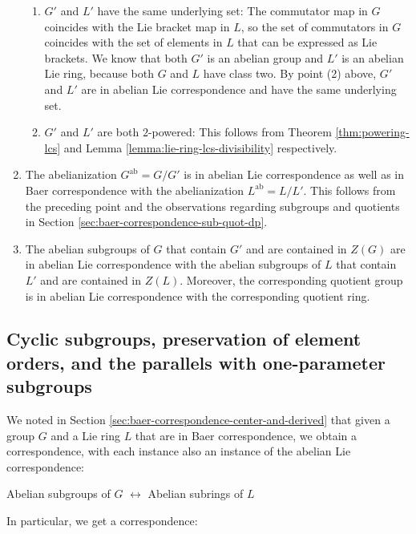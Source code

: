 \begin{enumerate}
  \begin{enumerate}
  \item $G'$ and $L'$ have the same underlying set: The commutator map
    in $G$ coincides with the Lie bracket map in $L$, so the set of
    commutators in $G$ coincides with the set of elements in $L$ that
    can be expressed as Lie brackets. We know that both $G'$ is an
    abelian group and $L'$ is an abelian Lie ring, because both $G$
    and $L$ have class two.  By point (2) above, $G'$ and $L'$ are in
    abelian Lie correspondence and have the same underlying set.
  \item $G'$ and $L'$ are both $2$-powered: This follows from Theorem
    \ref{thm:powering-lcs} and Lemma
    \ref{lemma:lie-ring-lcs-divisibility} respectively.
  \end{enumerate}
\item The abelianization $G^{\operatorname{ab}} = G/G'$ is in abelian
  Lie correspondence as well as in Baer correspondence with the
  abelianization $L^{\operatorname{ab}} = L/L'$. This follows from the
  preceding point and the observations regarding subgroups and
  quotients in Section \ref{sec:baer-correspondence-sub-quot-dp}.
\item The abelian subgroups of $G$ that contain $G'$ and are contained
  in $Z(G)$ are in abelian Lie correspondence with the abelian
  subgroups of $L$ that contain $L'$ and are contained in
  $Z(L)$. Moreover, the corresponding quotient group is in abelian Lie
  correspondence with the corresponding quotient ring.
\end{enumerate}

\subsection{Cyclic subgroups, preservation of element orders, and the parallels with one-parameter subgroups}\label{sec:baer-correspondence-cyclic-sub}

We noted in Section \ref{sec:baer-correspondence-center-and-derived}
that given a group $G$ and a Lie ring $L$ that are in Baer
correspondence, we obtain a correspondence, with each instance also an
instance of the abelian Lie correspondence:

\begin{center}
  Abelian subgroups of $G$ $\leftrightarrow$ Abelian subrings of $L$
\end{center}

In particular, we get a correspondence:

